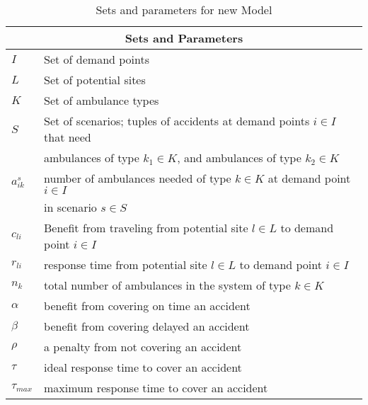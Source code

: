 
\begin{table}[h]
\centering
\begin{tabular}{ll}
\hline
\multicolumn{2}{c}{Sets and Parameters}                                                                         \\ \hline
$I$          & Set of demand points                            \\
$L$          & Set of potential sites                         \\
$K$          & Set of ambulance types                         \\
$S$      & Set of scenarios; tuples of accidents at demand points $i \in I$ that need \\
         & ambulances of type $k_1 \in K$, and ambulances of type $k_2 \in K$           \\
$a_{ik}^s$ & number of ambulances needed of type $k \in K$ at demand point $ i \in I$    \\
& in scenario $s \in S$                          \\
$c_{li}$ & Benefit from traveling from potential site $l \in L$ to demand point $i \in I$   \\
$r_{li}$ & response time from potential site $l \in L$ to demand point $i \in I$       \\
$n_k$    & total number of ambulances in the system of type $k \in K$                  \\
$\alpha$   & benefit from covering on time an accident      \\
$\beta$    & benefit from covering delayed an accident \\
$\rho$       & a penalty from not covering an accident          \\
$\tau$       &    ideal response time to cover an accident                                  \\
$\tau_{max}$ &     maximum response time to cover an accident                                           \\ \hline

\end{tabular}
\caption{Sets and parameters for new Model }
\label{tab:my-table1}
\end{table}

